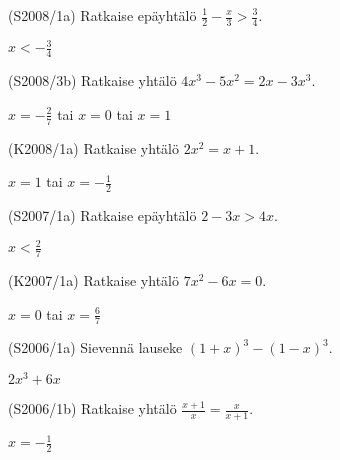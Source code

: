 \begin{multicols}{2}
\begin{tehtava}
(S2008/1a) Ratkaise epäyhtälö $\frac{1}{2} - \frac{x}{3} > \frac{3}{4}$.
\begin{vastaus}
$x<-\frac{3}{4}$
\end{vastaus}
\end{tehtava}


\begin{tehtava}
(S2008/3b) Ratkaise yhtälö $4x^3-5x^2=2x-3x^3$.
\begin{vastaus}
$x=-\frac{2}{7}$ tai $x=0$ tai $x=1$
\end{vastaus}
\end{tehtava}

\begin{tehtava}
(K2008/1a) Ratkaise yhtälö $2x^2=x+1$.
\begin{vastaus}
$x=1$ tai $x=-\frac{1}{2}$
\end{vastaus}
\end{tehtava}

\begin{tehtava}
(S2007/1a) Ratkaise epäyhtälö $2-3x>4x$.
\begin{vastaus}
$x< \frac{2}{7} $
\end{vastaus}
\end{tehtava}

\begin{tehtava}
(K2007/1a) Ratkaise yhtälö $7x^2-6x=0$.
\begin{vastaus}
$x=0$ tai $x=\frac{6}{7}$
\end{vastaus}
\end{tehtava}

\begin{tehtava}
(S2006/1a) Sievennä lauseke $(1+x)^3-(1-x)^3$.
\begin{vastaus}
$2x^3+6x$ 
\end{vastaus}
\end{tehtava}

\begin{tehtava}
(S2006/1b) Ratkaise yhtälö $ \frac{x+1}{x}=\frac{x}{x+1}$.
\begin{vastaus}
$x=-\frac{1}{2}$ 
\end{vastaus}
\end{tehtava}


\end{multicols}
